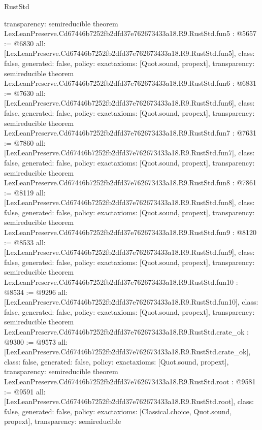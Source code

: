 \begin{lexlean}{RustStd}
\begin{coremodule}
{  transparency: semireducible
}
theorem LexLeanPreserve.Cd67446b7252fb2dfd37e762673433a18.R9.RustStd.fun5 : @5657 := @6830 {
  all: [LexLeanPreserve.Cd67446b7252fb2dfd37e762673433a18.R9.RustStd.fun5],
  class: false,
  generated: false,
  policy: exact{axioms: [Quot.sound, propext]},
  transparency: semireducible
}
theorem LexLeanPreserve.Cd67446b7252fb2dfd37e762673433a18.R9.RustStd.fun6 : @6831 := @7630 {
  all: [LexLeanPreserve.Cd67446b7252fb2dfd37e762673433a18.R9.RustStd.fun6],
  class: false,
  generated: false,
  policy: exact{axioms: [Quot.sound, propext]},
  transparency: semireducible
}
theorem LexLeanPreserve.Cd67446b7252fb2dfd37e762673433a18.R9.RustStd.fun7 : @7631 := @7860 {
  all: [LexLeanPreserve.Cd67446b7252fb2dfd37e762673433a18.R9.RustStd.fun7],
  class: false,
  generated: false,
  policy: exact{axioms: [Quot.sound, propext]},
  transparency: semireducible
}
theorem LexLeanPreserve.Cd67446b7252fb2dfd37e762673433a18.R9.RustStd.fun8 : @7861 := @8119 {
  all: [LexLeanPreserve.Cd67446b7252fb2dfd37e762673433a18.R9.RustStd.fun8],
  class: false,
  generated: false,
  policy: exact{axioms: [Quot.sound, propext]},
  transparency: semireducible
}
theorem LexLeanPreserve.Cd67446b7252fb2dfd37e762673433a18.R9.RustStd.fun9 : @8120 := @8533 {
  all: [LexLeanPreserve.Cd67446b7252fb2dfd37e762673433a18.R9.RustStd.fun9],
  class: false,
  generated: false,
  policy: exact{axioms: [Quot.sound, propext]},
  transparency: semireducible
}
theorem LexLeanPreserve.Cd67446b7252fb2dfd37e762673433a18.R9.RustStd.fun10 : @8534 := @9296 {
  all: [LexLeanPreserve.Cd67446b7252fb2dfd37e762673433a18.R9.RustStd.fun10],
  class: false,
  generated: false,
  policy: exact{axioms: [Quot.sound, propext]},
  transparency: semireducible
}
theorem LexLeanPreserve.Cd67446b7252fb2dfd37e762673433a18.R9.RustStd.crate_ok : @9300 := @9573 {
  all: [LexLeanPreserve.Cd67446b7252fb2dfd37e762673433a18.R9.RustStd.crate_ok],
  class: false,
  generated: false,
  policy: exact{axioms: [Quot.sound, propext]},
  transparency: semireducible
}
theorem LexLeanPreserve.Cd67446b7252fb2dfd37e762673433a18.R9.RustStd.root : @9581 := @9591 {
  all: [LexLeanPreserve.Cd67446b7252fb2dfd37e762673433a18.R9.RustStd.root],
  class: false,
  generated: false,
  policy: exact{axioms: [Classical.choice, Quot.sound, propext]},
  transparency: semireducible
}


\end{coremodule}
\end{lexlean}
